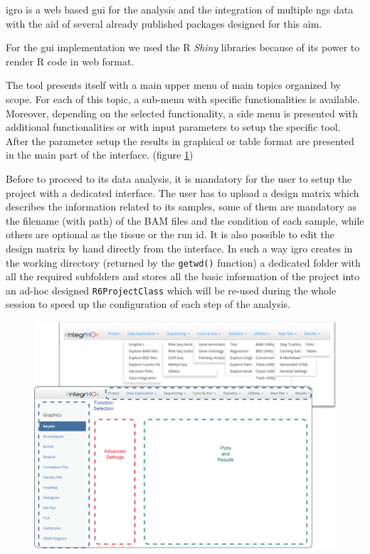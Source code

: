 \gls{igro} is a web based \gls{gui} for the analysis and the integration of multiple \gls{ngs} data with the aid of several already published packages designed for this aim. 

For the \gls{gui} implementation we used the R \textit{Shiny} libraries because of its power to render R code in web format.

The tool presents itself with a main upper menu of main topics organized by scope. For each of this topic, a sub-menu with specific functionalities is available.
Moreover, depending on the selected functionality, a side menu is presented with additional functionalities or with input parameters to setup the specific tool.
After the parameter setup the results in graphical or table format are presented in the main part of the interface. (figure \ref{fig:integrhomain})

Before to proceed to its data analysis, it is mandatory for the user to setup the project with a dedicated interface. 
The user has to upload a design matrix which describes the information related to its samples, some of them are mandatory as the filename (with path) of the BAM files and the condition of each sample, while others are optional as the tissue or the run id. It is also possible to edit the design matrix by hand directly from the interface.
In such a way \gls{igro} creates in the working directory (returned by the \lstinline!getwd()! function) a dedicated folder with all the required subfolders and stores all the basic information of the project into an ad-hoc designed \lstinline!R6ProjectClass! which will be re-used during the whole session to speed up the configuration of each step of the analysis.

\begin{figure}[H]
\includegraphics[width=\textwidth, keepaspectratio]{img/integrho/general_description.png}
\caption[integrho main interface]{}
\label{fig:integrhomain}
\centering
\end{figure}
 
